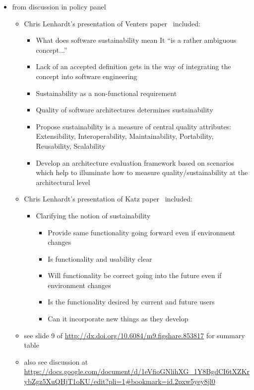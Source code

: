 \documentclass[11pt, oneside]{amsart}
\begin{document}
\begin{itemize}
\item from discussion in policy panel

\begin{itemize}
\item Chris Lenhardt's presentation of Venters paper~\cite{Venters_WSSSPE} included:

\begin{itemize}
\item What does software sustainability mean
It ``is a rather ambiguous concept...''
\item Lack of an accepted definition gets in the way of integrating the concept into software engineering
\item Sustainability as a non-functional requirement
\item Quality of software architectures determines sustainability
\item Propose sustainability is a measure of central quality attributes:
Extensibility,
Interoperability,
Maintainability,
Portability,
Reusability,
Scalability
\item Develop an architecture evaluation framework based on scenarios which help to illuminate how to measure quality/sustainability at the architectural level
\end{itemize}

\item Chris Lenhardt's presentation of Katz paper~\cite{Katz_WSSSPE} included:
\begin{itemize}
\item Clarifying the notion of sustainability
\begin{itemize}
\item Provide same functionality going forward even if environment changes
\item Is functionality and usability clear
\item Will functionality be correct going into the future even if environment changes
\item Is the functionality desired by current and future users
\item Can it incorporate new things as they develop
\end{itemize}
\end{itemize}

\item see slide 9 of \url{http://dx.doi.org/10.6084/m9.figshare.853817} for summary table

\item also see discussion at \url{https://docs.google.com/document/d/1eVfioGNlihXG_1Y8BgdCI6tXZKrybZgz5XuQHjT1oKU/edit?pli=1#bookmark=id.2pxw5yey8jl0}

\end{itemize}

\end{itemize}
\end{document}

